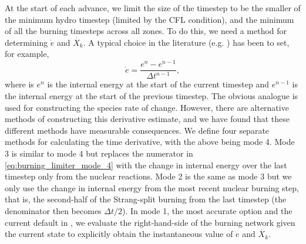 \documentclass[12pt]{article}
\begin{document}
At the start of each advance, we limit the size of the timestep to be the smaller
of the minimum hydro timestep (limited by the CFL condition), and the minimum of all the
burning timesteps across all zones. To do this, we need a method for determining
$\dot{e}$ and $\dot{X_k}$. A typical choice in the literature (e.g. \citealt{raskin:2010,hawley:2012}) has been to set, for example,
\begin{equation}
  \dot{e} = \frac{e^{n} - e^{n-1}}{\Delta t^{n-1}}, \label{eq:burning_limiter_mode_4}
\end{equation}
where is $e^n$ is the internal energy at the start of the current timestep and
$e^{n-1}$ is the internal energy at the start of the previous timestep.
The obvious analogue is used for constructing the species rate of change.
However, there are alternative methods of constructing this derivative estimate,
and we have found that these different methods have measurable consequences.
We define four separate methods for calculating the time derivative, with
the above being mode 4. Mode 3 is similar to mode 4 but replaces the
numerator in \autoref{eq:burning_limiter_mode_4} with the change in
internal energy over the last timestep only from the nuclear reactions.
Mode 2 is the same as mode 3 but we only use the change in internal
energy from the most recent nuclear burning step, that is, the second-half
of the Strang-split burning from the last timestep (the denominator
then becomes $\Delta t / 2$). In mode 1, the most accurate option and
the current default in \castro, we evaluate the right-hand-side of the
burning network given the current state to explicitly obtain the
instantaneous value of $\dot{e}$ and $\dot{X_k}$.
\end{document}
